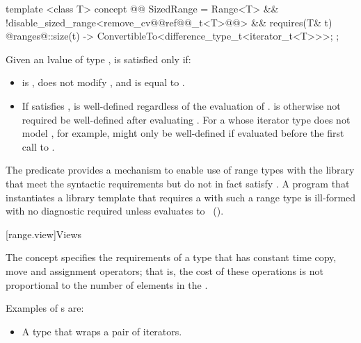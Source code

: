 {\begin{itemdecl}
template <class T>
concept @@ SizedRange =
  Range<T> &&
  !disable_sized_range<remove_cv@@ref@@_t<T>@\oldtxt{>}@> &&
  requires(T& t) {
    { @ranges@::size(t) } -> ConvertibleTo<difference_type_t<iterator_t<T>>>;
  };
\end{itemdecl}

\begin{itemdescr}
\pnum
Given an lvalue  of type ,  is satisfied only if:

\begin{itemize}
\item {} is , does not modify , and is equal
to .

\item If  satisfies ,
 is well-defined regardless of the evaluation of
. \enternote {} is otherwise not required be
well-defined after evaluating . For a 
whose iterator type does not model , for
example,  might only be well-defined if evaluated before
the first call to . \exitnote
\end{itemize}

\pnum
\enternote The  predicate provides a mechanism to enable use
of range types with the library that meet the syntactic requirements but do
not in fact satisfy . A program that instantiates a library template
that requires a  with such a range type  is ill-formed with no
diagnostic required unless
 evaluates
to ~(). \exitnote
\end{itemdescr}

[range.view]{Views}

\pnum
The  concept specifies the requirements of a
 type that has constant time copy, move and assignment operators; that
is, the cost of these operations is not proportional to the number of elements in
the .

\pnum
\enterexample
Examples of s are:

\begin{itemize}
\item A  type that wraps a pair of iterators.


\end{itemize}}
